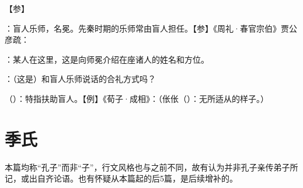 {
【参】 
}
{}


{
\item {}：盲人乐师，名冕。先秦时期的乐师常由盲人担任。【参】《周礼·春官宗伯》贾公彦疏：
\item {}：某人在这里，这是向师冕介绍在座诸人的姓名和方位。
\item {}：（这是）和盲人乐师说话的合礼方式吗？
\item {}（）：特指扶助盲人。【例】《荀子·成相》：（伥伥（）：无所适从的样子。）
}
{}



\chapter{季氏}

本篇均称“孔子”而非“子”，行文风格也与之前不同，故有认为并非孔子亲传弟子所记，或出自齐论语。也有怀疑从本篇起的后5篇，是后续增补的。%

\bigskip


